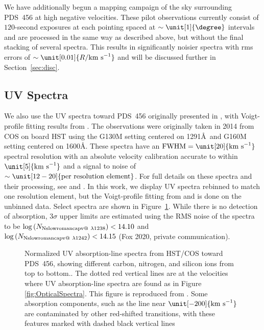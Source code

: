 \documentclass[twocolumn]{aastex63}
\makeatletter
\newcommand{\kms}{\mathrm{km~s}\ensuremath{^{-1}}}
\newcommand*{\rom}[1]{\expandafter\@slowromancap\romannumeral #1@}
\makeatother
\begin{document}
We have additionally begun a mapping campaign of the sky surrounding PDS~456 at high negative velocities. These pilot observations currently consist of $120$-second exposures at each pointing spaced at $\sim \unit[1]{\degree}$ intervals and are processed in the same way as described above, but without the final stacking of several spectra. This results in significantly noisier spectra with rms errors of $\sim \unit[0.01]{R/\kms}$ and will be discussed further in Section~\ref{sec:disc}. 

\subsection{UV Spectra}
We also use the UV spectra toward PDS~456 originally presented in \citet{Fox2015}, with Voigt-profile fitting results from \citet[][see their Table 2]{Bordoloi2017}. The observations were originally taken in 2014 from COS \citep{Green2012} on board HST using the G130M setting centered on 1291\AA\ and G160M setting centered on 1600\AA. These spectra have an $\mathrm{FWHM} = \unit[20]{\kms}$ spectral resolution with an absolute velocity calibration accurate to within $\unit[5]{\kms}$ and a signal to noise of $\sim \unit[12-20]{\text{per resolution element}}$. For full details on these spectra and their processing, see \citet{Fox2014, Fox2015} and \citet{Bordoloi2017}. In this work, we display UV spectra rebinned to match one resolution element, but the Voigt-profile fitting from \citet{Fox2015} and \citet{Bordoloi2017} is done on the unbinned data. Select spectra are shown in Figure~\ref{fig:UVSpectra}. While there is no detection of  absorption, $3\sigma$ upper limits are estimated using the RMS noise of the spectra to be $\log{\left(N_{\textrm{N\rom{5}}~\lambda1238}\right)} < 14.10$ and $\log{\left(N_{\textrm{N\rom{5}}~\lambda1242}\right)} < 14.15$ (Fox 2020, private communication).

\begin{figure}[]
\caption{Normalized UV absorption-line spectra from HST/COS toward PDS~456, showing different carbon, nitrogen, and silicon ions from top to bottom.. The dotted red vertical lines are at the velocities where UV absorption-line spectra are found as in Figure \ref{fig:OpticalSpectra}. This figure is reproduced from \citet[][their Figure 2]{Fox2015}. Some absorption components, such as the  line near $\unit[-200]{\kms}$ are contaminated by other red-shifted transitions, with these features marked with dashed black vertical lines \citep[see][for details]{Fox2015,Bordoloi2017}\label{fig:UVSpectra}}
\end{figure}
\end{document}
